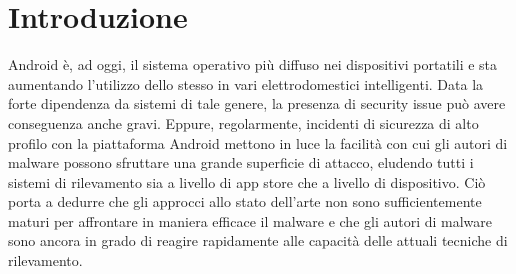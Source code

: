 \chapter{Introduzione}

Android è, ad oggi, il sistema operativo più diffuso nei dispositivi portatili e sta aumentando l'utilizzo dello stesso in vari elettrodomestici intelligenti. Data la forte dipendenza da sistemi di tale genere, la presenza di security issue può avere conseguenza anche gravi. Eppure, regolarmente, incidenti di sicurezza di alto profilo con la piattaforma Android mettono in luce la facilità con cui gli autori di malware possono sfruttare una grande superficie di attacco, eludendo tutti i sistemi di rilevamento sia a livello di app store che a livello di dispositivo. Ciò porta a dedurre che gli approcci allo stato dell'arte non sono sufficientemente maturi per affrontare in maniera efficace il malware e che gli autori di malware sono ancora in grado di reagire rapidamente alle capacità delle attuali tecniche di rilevamento.

